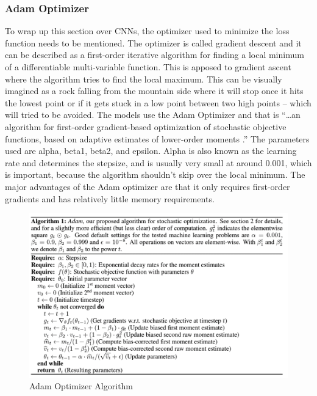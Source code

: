 \documentclass[12pt]{article}
\begin{document}
            \subsubsection{Adam Optimizer}

                To wrap up this section over CNNs, the optimizer used to minimize the loss function needs to be mentioned. 
                The optimizer is called gradient descent and it can be described as a first-order iterative algorithm 
                for finding a local minimum of a differentiable multi-variable function. 
                This is apposed to gradient ascent where the algorithm tries to find the local maximum. 
                This can be visually imagined as a rock falling from the mountain side 
                where it will stop once it hits the lowest point or if it gets stuck in a low point between two high points -- 
                which will tried to be avoided. The models use the Adam Optimizer and that is “…an algorithm 
                for first-order gradient-based optimization of stochastic objective functions, based on adaptive estimates 
                of lower-order moments \cite{kingma2015}.” The parameters used are alpha, beta1, beta2, and epsilon. 
                Alpha is also known as the learning rate and determines the stepsize, 
                and is usually very small at around 0.001, which is important, 
                because the algorithm shouldn’t skip over the local minimum. 
                The major advantages of the Adam optimizer are that it only requires first-order gradients 
                and has relatively little memory requirements.

                \begin{figure}[ht]
                
                    \begin{center}

                        \includegraphics[scale=0.9]{adam-opt.png}
                        \caption{Adam Optimizer Algorithm \cite{kingma2015}}
            
                    \end{center}
                    
                \end{figure}
\end{document}
